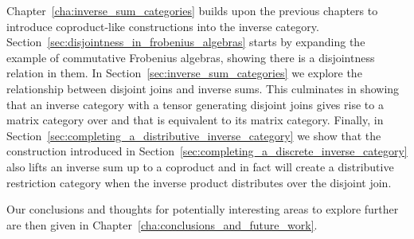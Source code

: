 Chapter~\ref{cha:inverse_sum_categories} builds upon the previous chapters to introduce
coproduct-like constructions into the inverse
category. Section~\ref{sec:disjointness_in_frobenius_algebras} starts by expanding the example of
commutative Frobenius algebras, showing there is a disjointness relation in them. In
Section~\ref{sec:inverse_sum_categories} we explore the relationship between disjoint joins and
inverse sums. This culminates in showing that an inverse category \X with a tensor generating disjoint
joins gives rise to a matrix category over \X and that \X is equivalent to its matrix
category. Finally, in Section~\ref{sec:completing_a_distributive_inverse_category} we show that the
construction introduced in Section~\ref{sec:completing_a_discrete_inverse_category} also lifts an
inverse sum up to a coproduct and in fact will create a distributive restriction category when the
inverse product distributes over the disjoint join.

Our conclusions and thoughts for potentially interesting areas to explore further are then given in
Chapter~\ref{cha:conclusions_and_future_work}.



